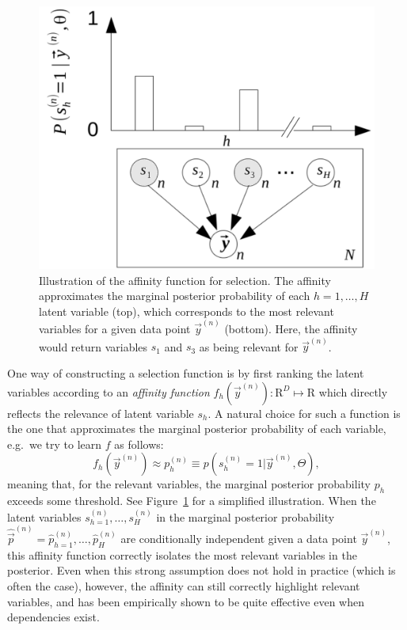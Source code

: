\begin{figure}[h]
\begin{center}
\includegraphics[width=.35\textwidth]{figs/graph-affinity.pdf}
\caption{Illustration of the affinity function for selection.
The affinity approximates the marginal posterior probability of each $h=1,\dots,H$ latent variable (top), 
which corresponds to the most relevant variables for a given data point $\vec{y}^{(n)}$ (bottom). 
Here, the affinity would return variables $s_1$ and $s_3$ as being relevant for $\vec{y}^{(n)}$.
}\label{fig:graph-affinity}
\end{center}
\end{figure}
%
One way of constructing a selection function %
is by first ranking the latent variables according to an 
\emph{affinity function} $f_h(\vec{y}^{(n)}) : \mathrm{R}^D \mapsto \mathrm{R}$ %
which directly reflects the relevance of latent variable $s_h$. 
%
A natural choice for such a function is the one that approximates the marginal posterior probability 
of each variable, e.g.\ we try to learn $f$ as follows:
%
\begin{equation}
\label{eq:affinity}
f_h(\vec{y}^{(n)}) \approx p^{(n)}_h \equiv p(s^{(n)}_h = 1|\vec{y}^{(n)}, \Theta),
\end{equation}
%
meaning that, for the relevant variables, the marginal posterior probability $p_h$ 
exceeds some threshold. %
See Figure~\ref{fig:graph-affinity} for a simplified illustration. 
%
When the latent variables $s_{h=1}^{(n)}, \dots, s_H^{(n)}$ in the marginal posterior probability $\hat{\vec{p}}^{(n)} = \hat{p}_{h=1}^{(n)},\dots, \hat{p}_H^{(n)}$ are conditionally independent given a data point $\vec{y}^{(n)}$, this affinity function correctly isolates the most relevant variables in the posterior.
%
Even when this strong assumption does not hold in practice (which is often the case), however,
the affinity can still correctly highlight relevant variables,
and has been empirically shown to be quite effective even when dependencies exist.


